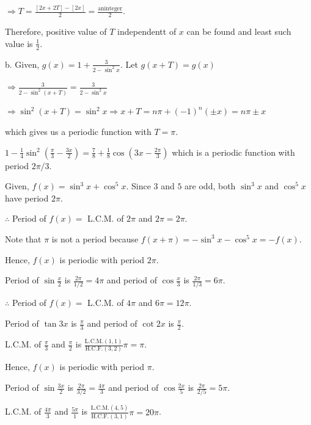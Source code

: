   $\Rightarrow T = \frac{[2x + 2T] - [2x]}{2} = \frac{\mathrm{an integer}}{2}$.

  Therefore, positive value of $T$ independentt of $x$ can be found and least such value is
  $\frac{1}{2}$.

  b. Given, $g(x) = 1 + \frac{3}{2 - \sin^2x}$. Let $g(x + T) = g(x)$

  $\Rightarrow \frac{3}{2 - \sin^2(x + T)} = \frac{3}{2 - \sin^2x}$

  $\Rightarrow \sin^2(x + T) = \sin^2x \Rightarrow x + T = n\pi +(-1)^n(\pm x) = n\pi\pm x$

  which gives us a periodic function with $T = \pi$.

\item $1 - \frac{1}{4}\sin^2\left(\frac{\pi}{3} - \frac{3x}{2}\right) = \frac{7}{8} +
  \frac{1}{8}\cos\left(3x - \frac{2\pi}{3}\right)$ which is a periodic function with period $2\pi/3$.
\item Given, $f(x) = \sin^3x + \cos^5x$. Since $3$ and $5$ are odd, both $\sin^3x$ and $\cos^5x$
  have period $2\pi$.

  $\therefore$ Period of $f(x) = $ L.C.M. of $2\pi$ and $2\pi = 2\pi$.

  Note that $\pi$ is not a period because $f(x + \pi) = -\sin^3x - \cos^5x = -f(x)$.

  Hence, $f(x)$ is periodic with period $2\pi$.

\item Period of $\sin\frac{x}{2}$ is $\frac{2\pi}{1/2} = 4\pi$ and period of $\cos\frac{x}{3}$ is
  $\frac{2\pi}{1/3} = 6\pi$.

  $\therefore$ Period of $f(x) = $ L.C.M. of $4\pi$ and $6\pi = 12\pi$.

\item Period of $\tan3x$ is $\frac{\pi}{3}$ and period of $\cot2x$ is $\frac{\pi}{2}$.

  L.C.M. of $\frac{\pi}{3}$ and $\frac{\pi}{2}$ is $\frac{\mathrm{L.C.M.(1, 1)}}{\mathrm{H.C.F.(3,
  2)}}\pi = \pi$.

  Hence, $f(x)$ is periodic with period $\pi$.

\item Period of $\sin\frac{3x}{2}$ is $\frac{2\pi}{3/2} = \frac{4\pi}{3}$ and period of
  $\cos\frac{2x}{5}$ is $\frac{2\pi}{2/5} = 5\pi$.

  L.C.M. of $\frac{4\pi}{3}$ and $\frac{5\pi}{1}$ is $\frac{\mathrm{L.C.M.(4, 5)}}{\mathrm{H.C.F.(3,
  1)}}\pi = 20\pi$.

